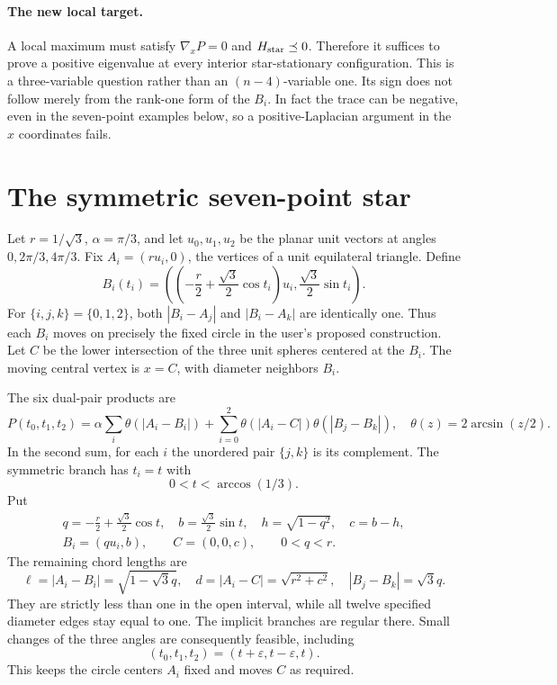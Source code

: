 \documentclass[11pt]{article}
\theoremstyle{remark}\newtheorem{remark}[theorem]{Remark}
\begin{document}
\paragraph{The new local target.}
A local maximum must satisfy $\nabla_xP=0$ and
$H_{\rm star}\preceq0$. Therefore it suffices to prove a positive
eigenvalue at every interior star-stationary configuration. This is a
three-variable question rather than an $(n-4)$-variable one. Its sign
does not follow merely from the rank-one form of the $B_i$.
In fact the trace can be negative, even in the seven-point examples
below, so a positive-Laplacian argument in the $x$ coordinates fails.

\section{The symmetric seven-point star}
Let $r=1/\sqrt3$, $\alpha=\pi/3$, and let $u_0,u_1,u_2$ be the planar
unit vectors at angles $0,2\pi/3,4\pi/3$. Fix
$A_i=(ru_i,0)$, the vertices of a unit equilateral triangle. Define
\[
 B_i(t_i)=\left(\left(-\frac r2+\frac{\sqrt3}{2}\cos t_i\right)u_i,
                         \frac{\sqrt3}{2}\sin t_i\right).
\]
For $\{i,j,k\}=\{0,1,2\}$, both $|B_i-A_j|$ and $|B_i-A_k|$
are identically one. Thus each $B_i$ moves on precisely the fixed
circle in the user's proposed construction. Let $C$ be the lower
intersection of the three unit spheres centered at the $B_i$.
The moving central vertex is $x=C$, with diameter neighbors $B_i$.

The six dual-pair products are
\begin{equation}\label{star:sevenobjective}
 P(t_0,t_1,t_2)=\alpha\sum_i\theta(|A_i-B_i|)
  +\sum_{i=0}^2
        \theta(|A_i-C|)\theta(|B_j-B_k|),
 \quad\theta(z)=2\arcsin(z/2).
\end{equation}
In the second sum, for each $i$ the unordered pair $\{j,k\}$ is its
complement. The symmetric branch has $t_i=t$ with
\[
 0<t<\arccos(1/3).
\]
Put
\begin{gather*}
 q=-\frac r2+\frac{\sqrt3}{2}\cos t,\quad
 b=\frac{\sqrt3}{2}\sin t,\quad
 h=\sqrt{1-q^2},\quad c=b-h,\\
 B_i=(qu_i,b),\qquad C=(0,0,c),\qquad 0<q<r.
\end{gather*}
The remaining chord lengths are
\[
 \ell=|A_i-B_i|=\sqrt{1-\sqrt3q},\quad
 d=|A_i-C|=\sqrt{r^2+c^2},\quad
 |B_j-B_k|=\sqrt3q.
\]
They are strictly less than one in the open interval, while all twelve
specified diameter edges stay equal to one. The implicit branches are
regular there. Small changes of the three angles are consequently
feasible, including
\begin{equation}\label{star:antimotion}
 (t_0,t_1,t_2)=(t+\varepsilon,t-\varepsilon,t).
\end{equation}
This keeps the circle centers $A_i$ fixed and moves $C$ as required.
\end{document}
